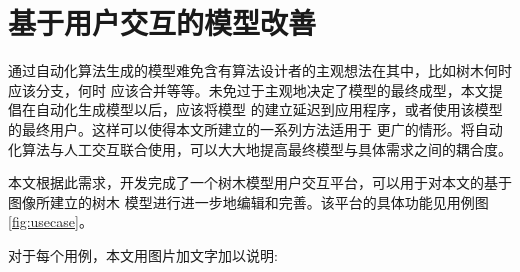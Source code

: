 \chapter{基于用户交互的模型改善}
通过自动化算法生成的模型难免含有算法设计者的主观想法在其中，比如树木何时应该分支，何时
应该合并等等。未免过于主观地决定了模型的最终成型，本文提倡在自动化生成模型以后，应该将模型
的建立延迟到应用程序，或者使用该模型的最终用户。这样可以使得本文所建立的一系列方法适用于
更广的情形。将自动化算法与人工交互联合使用，可以大大地提高最终模型与具体需求之间的耦合度。

本文根据此需求，开发完成了一个树木模型用户交互平台，可以用于对本文的基于图像所建立的树木
模型进行进一步地编辑和完善。该平台的具体功能见用例图\ref{fig:usecase}。

对于每个用例，本文用图片加文字加以说明:\\


